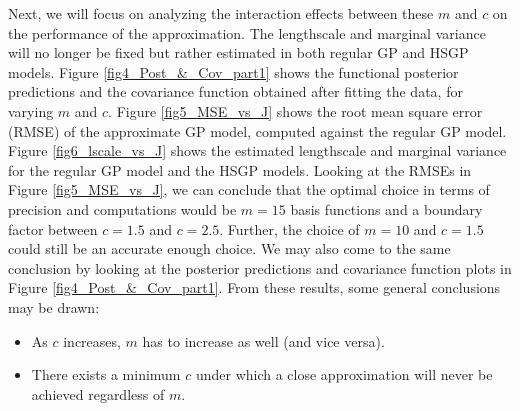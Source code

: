 \documentclass[]{interact}
\theoremstyle{plain}%
\theoremstyle{definition}
\theoremstyle{remark}
\begin{document}
Next, we will focus on analyzing the interaction effects between these $m$ and $c$ on the performance of the approximation. The lengthscale and marginal variance will no longer be fixed but rather estimated in both regular GP and HSGP models.  
Figure \ref{fig4_Post_&_Cov_part1} shows the functional posterior predictions and the covariance function obtained after fitting the data, for varying $m$ and $c$. Figure \ref{fig5_MSE_vs_J} shows the root mean square error (RMSE) of the approximate GP model, computed against the regular GP model. Figure \ref{fig6_lscale_vs_J} shows the estimated lengthscale and marginal variance for the regular GP model and the HSGP models. Looking at the RMSEs in Figure \ref{fig5_MSE_vs_J}, we can conclude that the optimal choice in terms of precision and computations would be $m = 15$ basis functions and a boundary factor between $c = 1.5$ and $c = 2.5$. Further, the choice of $m = 10$ and $c = 1.5$ could still be an accurate enough choice. We may also come to the same conclusion by looking at the posterior predictions and covariance function plots in Figure \ref{fig4_Post_&_Cov_part1}. From these results, some general conclusions may be drawn:

\begin{itemize}
\item As $c$ increases, $m$ has to increase as well (and vice versa).
\item There exists a minimum $c$ under which a close approximation will never be achieved regardless of $m$.
\end{itemize}
\end{document}
